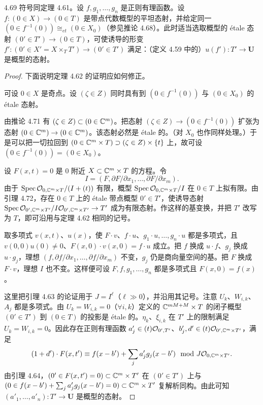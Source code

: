 \begin{propositionp}{4.69}
符号同定理 4.61。设 $f,g_1,\dots,g_n$ 是正则有理函数。设 $f:(0\in X)\to(0\in T)$ 是带点代数概型的平坦态射，并给定同一 $(0\in f^{-1}(0))\cong_{et}(0\in X_0)$（参见推论 4.68）。此时适当选取概型的 étale 态射 $(0'\in T')\to(0\in T)$，可使诱导的形变 $f':(0'\in X'=X\times_TT')\to(0'\in T')$
满足：（定义 4.59 中的）$u(f'):T'\to\mathbf U$ 是概型的态射。
\end{propositionp}

\begin{proof}
下面说明定理 4.62 的证明应如何修正。

可设 $0\in X$ 是奇点。设 $(\zeta\in Z)$ 同时具有到 $(0\in f^{-1}(0))$ 与 $(0\in X_0)$ 的 étale 态射。

由推论 4.71 有 $(\zeta\in Z)\subset(0\in\mathbb{C}^m)$。把态射 $(\zeta\in Z)\to(0\in f^{-1}(0))$ 扩张为态射 $(0\in\mathbb{C}^m)\to(0\in\mathbb{C}^m)$。该态射必然是 étale 的。（对 $X_0$ 也作同样处理。）于是可以把一切拉回到 $(0\in\mathbb{C}^m\times T)\supset(\zeta\in Z)\times\{t\}$ 上，故可设 $(0\in f^{-1}(0))=(0\in X_0)$。

设 $F(x,t)=0$ 是 $0$ 附近 $X\subset\mathbb{C}^m\times T$ 的方程。令
\[ I=(F,\partial F/\partial x_1,\dots,\partial F/\partial x_m). \]
由于 $\operatorname{Spec}\mathcal{O}_{0,\mathbb{C}^m\times T}/(I+(t))$ 有限，概型 $\operatorname{Spec}\mathcal{O}_{0,\mathbb{C}^m\times T}/I$ 在 $0\in T$ 上拟有限。由引理 4.72，存在 $0\in T$ 上的 étale 带点概型 $0'\in T'$，使诱导态射 $\operatorname{Spec}\mathcal{O}_{0',\mathbb{C}^m\times T'}/I\mathcal{O}_{0',\mathbb{C}^m\times T'}\to T'$ 成为有限态射。作这样的基变换，并把 $T'$ 改写为 $T$，即可沿用与定理 4.62 相同的记号。

取多项式 $v(x,t)$、$u(x)$，使 $F\cdot v$、$f\cdot u$、$g_1\cdot u,\dots,g_n\cdot u$ 都是多项式，且 $v(0,0)u(0)\ne0$、$F(x,0)\cdot v(x,0)=f\cdot u$ 成立。把 $f$ 换成 $u\cdot f$、$g_j$ 换成 $u\cdot g_j$，理想 $(f,\partial f/\partial x_1,\dots,\partial f/\partial x_m)$ 不变，$g_j$ 仍是商向量空间的基。把 $F$ 换成 $F\cdot v$，理想 $I$ 也不变。这样便可设 $F,f,g_1,\dots,g_n$ 都是多项式且 $F(x,0)=f(x)$。

这里把引理 4.63 的论证用于 $J=I^\ell$（$\ell\gg0$），并沿用其记号。注意 $U_k$、$W_{i,k}$、$A_j$ 都是多项式。由 $U_k=W_{i,k}=0$（$\forall i,k$）定义的 $\mathbb{C}^{mM+M}\times T$ 的闭子概型 $(0'\in T')$ 到 $(0\in T)$ 的投影是 étale 的。$\eta_k$、$\xi_{i,k}$ 在 $T'$ 上的限制满足 $U_k=W_{i,k}=0$。因此存在正则有理函数 $a'_j\in(t)\mathcal{O}_{0',T'}$、$b'_j,d'\in(t)\mathcal{O}_{0',\mathbb{C}^m\times T'}$，满足
\[ (1+d')\cdot F(x,t')\equiv f(x-b')+\sum_ja'_jg_j(x-b')\mod J\mathcal{O}_{0,\mathbb{C}^m\times T'}. \]
由引理 4.64，$(0'\in F(x,t')=0)\subset\mathbb{C}^m\times T'$ 在 $(0'\in T')$ 上与 $(0\in f(x-b')+\sum_ja'_jg_j(x-b')=0)\subset\mathbb{C}^m\times T'$ 复解析同构。由此可知 $(a'_1,\dots,a'_n):T'\to\mathbf U$ 是概型的态射。
\end{proof}

